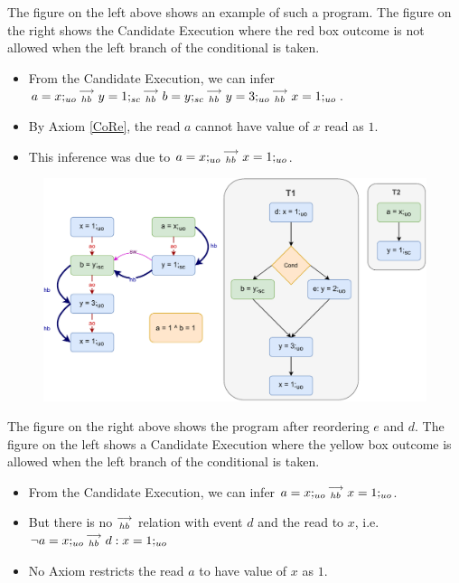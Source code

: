             The figure on the left above shows an example of such a program.  
            The figure on the right shows the Candidate Execution where the red box outcome is not allowed when the left branch of the conditional is taken.
            \begin{itemize}
                \item From the Candidate Execution, we can infer $a=x;_{uo}\stackrel{\longrightarrow}{_{hb}}y=1;_{sc}\stackrel{\longrightarrow}{_{hb}}b=y;_{sc}\stackrel{\longrightarrow}{_{hb}}y=3;_{uo}\stackrel{\longrightarrow}{_{hb}}x=1;_{uo}$.
                \item By Axiom \ref{CoRe}, the read $a$ cannot have value of $x$ read as $1$. 
                \item This inference was due to $a=x;_{uo}\stackrel{\longrightarrow}{_{hb}}x=1;_{uo}$.
            \end{itemize}

            \begin{figure}[H]
                \centering 
                \includegraphics[scale=0.7]{5.InstructionReordering/5.ValidReorderingProgram/CounterExamples1b(Conditionals).pdf}
                \caption{}
            \end{figure}
            The figure on the right above shows the program after reordering $e$ and $d$.  
            The figure on the left shows a Candidate Execution where the yellow box outcome is allowed when the left branch of the conditional is taken.
            \begin{itemize}
                \item From the Candidate Execution, we can infer $a=x;_{uo}\stackrel{\longrightarrow}{_{hb}}x=1;_{uo}$. 
                \item But there is no $\stackrel{\longrightarrow}{_{hb}}$ relation with event $d$ and the read to $x$, i.e. $\neg a=x;_{uo}\stackrel{\longrightarrow}{_{hb}}d:x=1;_{uo}$
                \item No Axiom restricts the read $a$ to have value of $x$ as $1$.
            \end{itemize}

